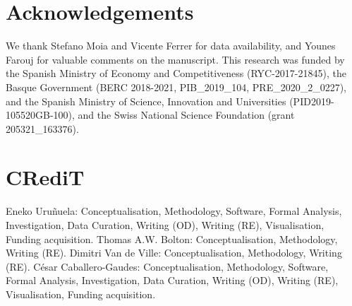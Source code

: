 \documentclass[preprint]{elsarticle}
\begin{document}
\section{Acknowledgements}
We thank Stefano Moia and Vicente Ferrer for data availability, and Younes
Farouj for valuable comments on the manuscript. This research was funded by the
Spanish Ministry of Economy and Competitiveness (RYC-2017-21845), the Basque
Government (BERC 2018-2021, PIB\_2019\_104, PRE\_2020\_2\_0227), and the Spanish
Ministry of Science, Innovation and Universities (PID2019-105520GB-100), and the
Swiss National Science Foundation (grant 205321\_163376).

\section{CRediT}
Eneko Uru\~nuela: Conceptualisation, Methodology, Software, Formal Analysis,
Investigation, Data Curation, Writing (OD), Writing (RE), Visualisation, Funding
acquisition. Thomas A.W. Bolton: Conceptualisation, Methodology, Writing (RE).
Dimitri Van de Ville: Conceptualisation, Methodology, Writing (RE). C\'{e}sar
Caballero-Gaudes: Conceptualisation, Methodology, Software, Formal Analysis,
Investigation, Data Curation, Writing (OD), Writing (RE), Visualisation, Funding
acquisition.



\newpage

\end{document}
